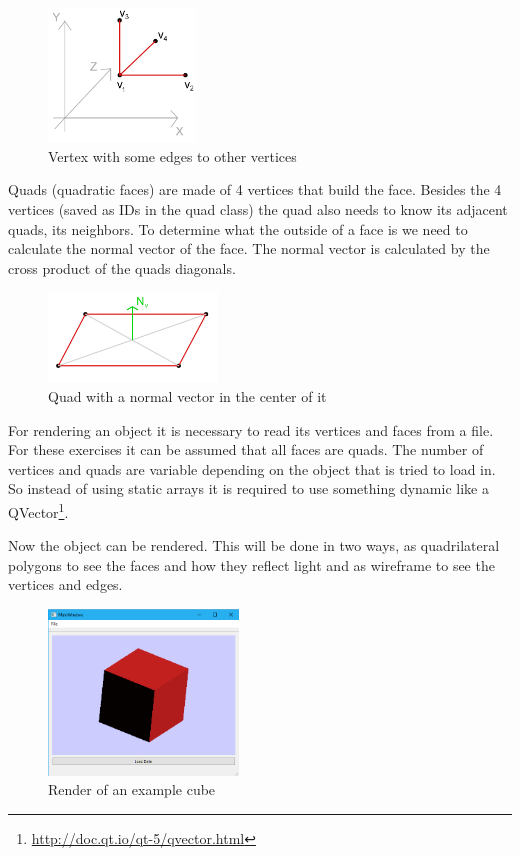 \documentclass[11.5pt,oneside,a4paper]{scrartcl}
\newcounter{ct}
\begin{document}
\begin{figure}
	\label{fig:vertex}
	\centering
	\includegraphics[width=0.35\textwidth]{vertex.png}
	\caption{Vertex with some edges to other vertices}
	\vspace{0.6cm}
\end{figure}

Quads (quadratic faces) are made of 4 vertices that build the face. Besides the 4 vertices (saved as IDs in the quad class) the quad also needs to know its adjacent quads, its neighbors. To determine what the outside of a face is we need to calculate the normal vector of the face. The normal vector is calculated by the cross product of the quads diagonals.

\begin{figure}
	\label{fig:quad}
	\centering
	\includegraphics[width=0.4\textwidth]{quad.png}
	\caption{Quad with a normal vector in the center of it}
	\vspace{-1cm}
\end{figure}

For rendering an object it is necessary to read its vertices and faces from a file. For these exercises it can be assumed that all faces are quads. The number of vertices and quads are variable depending on the object that is tried to load in. So instead of using static arrays it is required to use something dynamic like a QVector\footnote{\url{http://doc.qt.io/qt-5/qvector.html}}.

Now the object can be rendered. This will be done in two ways, as quadrilateral polygons to see the faces and how they reflect light and as wireframe to see the vertices and edges.

\begin{figure}
	\label{fig:renderedcube}
	\centering
	\includegraphics[width=0.45\textwidth]{renderedcube.png}
	\caption{Render of an example cube}
\end{figure}
\end{document}
